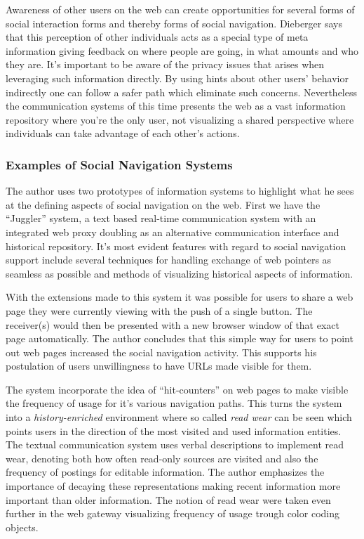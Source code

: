 \documentclass[12pt,a4paper]{article}
\begin{document}
Awareness of other users on the web can create opportunities for several forms
of social interaction forms and thereby forms of social navigation. Dieberger
says that this perception of other individuals acts as a special type of meta
information giving feedback on where people are going, in what amounts and
who they are. It's important to be aware of the privacy issues that arises
when leveraging such information directly. By using hints about other users'
behavior indirectly one can follow a safer path which eliminate such
concerns. Nevertheless the communication systems of this time presents the web
as a vast information repository where you're the only user, not visualizing a
shared perspective where individuals can take advantage of each other's
actions.

\subsubsection{Examples of Social Navigation Systems}

The author uses two prototypes of information systems to highlight what he
sees at the defining aspects of social navigation on the web. First we have
the ``Juggler'' system, a text based real-time communication system
with an integrated web proxy doubling as an alternative communication
interface and historical repository. It's most evident features with
regard to social navigation support include several techniques for handling
exchange of web pointers as seamless as possible and methods of visualizing
historical aspects of information.

With the extensions made to this system it was possible for users to share a
web page they were currently viewing with the push of a single button. The
receiver(s) would then be presented with a new browser window of that exact
page automatically. The author concludes that this simple way for users to
point out web pages increased the social navigation activity.
This supports his postulation of users unwillingness to have URLs made visible
for them.

The system incorporate the idea of ``hit-counters'' on web pages
to make visible the frequency of usage for it's various navigation paths. This
turns the system into a \emph{history-enriched} \cite{hill94}
environment where so called
\emph{read wear} \cite{hill92} can be seen which points users in the direction
of the most visited and used information entities. The textual communication
system uses verbal descriptions to implement read wear, denoting both how often
read-only sources are visited and also the frequency of postings for editable
information. The author emphasizes the importance of decaying these
representations making recent information more important than older
information. The notion of read wear were taken even further in the web
gateway visualizing frequency of usage trough color coding objects.
\end{document}
